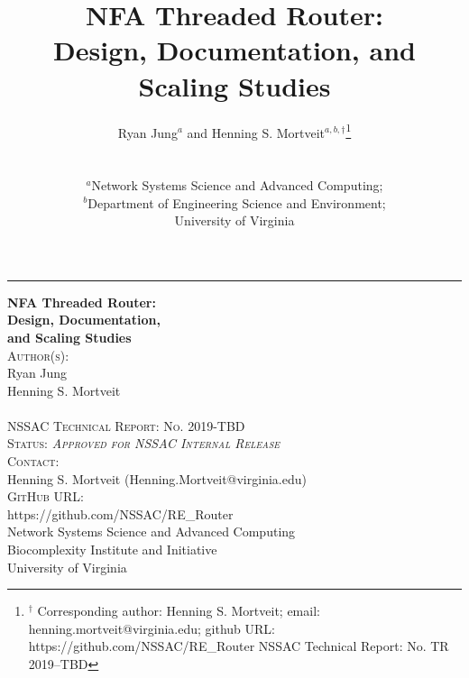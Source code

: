 \documentclass[English]{article}
\theoremstyle{remark}
\numberwithin{equation}{section}
\begin{document}
\begin{titlepage}
\raggedleft\raggedbottom
\rule{1pt}{\textheight} %
\hspace{0.05\textwidth} %
\parbox[b]{0.75\textwidth}{ %
  {\huge\bfseries NFA Threaded Router:\\[1ex]
    Design, Documentation, \\[1ex] and Scaling Studies}\\[9\baselineskip]
{{\Large\textsc{Author(s):}\\[1ex]
\phantom{\quad}Ryan Jung\\[1ex]
\phantom{\quad}Henning S. Mortveit\\[1ex]
}}\\[4\baselineskip]
{{\Large\textsc{NSSAC Technical Report: No. 2019-TBD}}}\\[2\baselineskip]
{{\Large\textsc{Status: \emph{Approved for NSSAC Internal Release}}}}\\[2\baselineskip]
{{\Large\textsc{Contact:}\\[1ex]\phantom{\quad}Henning S. Mortveit (Henning.Mortveit@virginia.edu)}}\\[2\baselineskip]
{{\Large\textsc{GitHub URL:}\\[1ex]\phantom{\quad}https://github.com/NSSAC/RE\_Router}}\\[7\baselineskip]
\vspace*{\fill}
\vfill
Network Systems Science and Advanced Computing\\
Biocomplexity Institute and Initiative\\
University of Virginia
}
\end{titlepage}


\title{NFA Threaded Router: \\Design, Documentation, and Scaling Studies}
\author{
Ryan Jung${}^a$ and
Henning S. Mortveit${}^{a,b,\dag}$\footnote{$^\dag$
  Corresponding author: Henning S. Mortveit;\hfil\break
  email: henning.mortveit@virginia.edu;\hfil\break
  github URL: https://github.com/NSSAC/RE\_Router\hfil\break
  NSSAC Technical Report: No. TR 2019--TBD
}\\
\\[1ex]\\
${}^a$Network Systems Science and Advanced Computing;\\
${}^b$Department of Engineering Science and Environment;\\
University of Virginia
}
\maketitle
\end{document}
